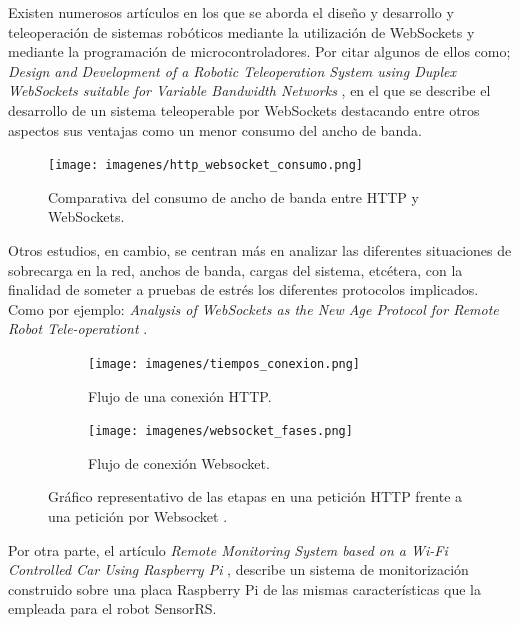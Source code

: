 Existen numerosos artículos en los que se aborda el diseño y desarrollo y teleoperación de sistemas robóticos mediante la utilización de WebSockets y mediante la programación de microcontroladores. Por citar algunos de ellos como; \emph{Design and Development of a Robotic Teleoperation System using
Duplex WebSockets suitable for Variable Bandwidth Networks} \cite{article:1}, en el que se describe el desarrollo de un sistema teleoperable por WebSockets destacando entre otros aspectos sus ventajas como
un menor consumo del ancho de banda.\\
  
\begin{figure}[H]
  \begin{center}
    \texttt{[image: imagenes/http\_websocket\_consumo.png]}
  \end{center}
  \label{fig:consumos_ancho_banda}
 \caption{ Comparativa del consumo de ancho de banda entre HTTP y WebSockets.}
\end{figure}
  
    
Otros estudios, en cambio, se centran más en analizar las diferentes situaciones de sobrecarga en la red, anchos de banda, cargas del sistema, etcétera, con la finalidad de someter a pruebas de estrés
los diferentes protocolos implicados. Como por ejemplo: \emph{Analysis of WebSockets as the New Age Protocol for Remote Robot Tele-operationt} \cite{article:2}.\\
 
   
\begin{figure}[H]
    \centering
    \begin{subfigure}[b]{0.4\textwidth}
        \texttt{[image: imagenes/tiempos\_conexion.png]}
        \caption{Flujo de una conexión HTTP.}
        \label{fig:gull}
    \end{subfigure}
    \begin{subfigure}[b]{0.5\textwidth}
        \texttt{[image: imagenes/websocket\_fases.png]}
        \caption{Flujo de conexión Websocket. }
        \label{fig:tiger}
    \end{subfigure}
    \caption{Gráfico representativo de las etapas en una petición HTTP frente a una petición por Websocket  \cite{article:3}.}\label{fig:animals}
\end{figure}
  
  
Por otra parte, el artículo \emph{ Remote Monitoring System based on a Wi-Fi Controlled Car Using Raspberry Pi } \cite{article:3}, describe un sistema de monitorización construido sobre una placa 
Raspberry Pi de las mismas características que la empleada para el robot SensorRS.\\ 


